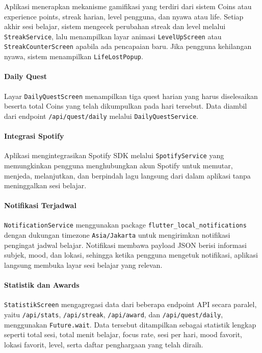 \documentclass[11pt]{article}
\begin{document}
Aplikasi menerapkan mekanisme gamifikasi yang terdiri dari sistem Coins atau experience points, streak harian, level pengguna, dan nyawa atau life. Setiap akhir sesi belajar, sistem mengecek perubahan streak dan level melalui \texttt{StreakService}, lalu menampilkan layar animasi \texttt{LevelUpScreen} atau \texttt{StreakCounterScreen} apabila ada pencapaian baru. Jika pengguna kehilangan nyawa, sistem menampilkan \texttt{LifeLostPopup}.

\paragraph{Daily Quest}

Layar \texttt{DailyQuestScreen} menampilkan tiga quest harian yang harus diselesaikan beserta total Coins yang telah dikumpulkan pada hari tersebut. Data diambil dari endpoint \texttt{/api/quest/daily} melalui \texttt{DailyQuestService}.

\paragraph{Integrasi Spotify}

Aplikasi mengintegrasikan Spotify SDK melalui \texttt{SpotifyService} yang memungkinkan pengguna menghubungkan akun Spotify untuk memutar, menjeda, melanjutkan, dan berpindah lagu langsung dari dalam aplikasi tanpa meninggalkan sesi belajar.

\paragraph{Notifikasi Terjadwal}

\texttt{NotificationService} menggunakan package \texttt{flutter\_local\_notifications} dengan dukungan timezone \texttt{Asia/Jakarta} untuk mengirimkan notifikasi pengingat jadwal belajar. Notifikasi membawa payload JSON berisi informasi subjek, mood, dan lokasi, sehingga ketika pengguna mengetuk notifikasi, aplikasi langsung membuka layar sesi belajar yang relevan.

\paragraph{Statistik dan Awards}

\texttt{StatistikScreen} mengagregasi data dari beberapa endpoint API secara paralel, yaitu \texttt{/api/stats}, \texttt{/api/streak}, \texttt{/api/award}, dan \texttt{/api/quest/daily}, menggunakan \texttt{Future.wait}. Data tersebut ditampilkan sebagai statistik lengkap seperti total sesi, total menit belajar, focus rate, sesi per hari, mood favorit, lokasi favorit, level, serta daftar penghargaan yang telah diraih.
\end{document}
